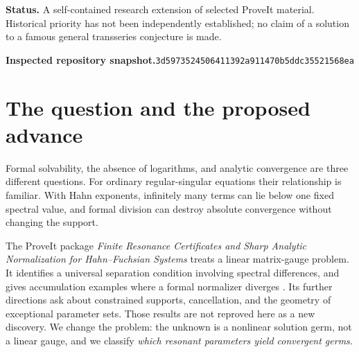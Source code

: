 \documentclass[11pt,a4paper]{article}
\numberwithin{equation}{section}
\theoremstyle{definition}
\theoremstyle{remark}
\newcommand{\snap}{\texttt{3d5973524506411392a911470b5ddc35521568ea}}
\begin{document}
\begin{titlepage}
\begin{abstract}
All theorem-level arguments are given in the article. The accompanying
program checks 670 exact scalar equalities, including 21 finite systems.
These computations are consistency checks, not a formal verification of
the infinite-support results.
\end{abstract}
\vfill
\noindent\small\textbf{Status.} A self-contained research extension of selected
ProveIt material. Historical priority has not been independently established;
no claim of a solution to a famous general transseries conjecture is made.\par
\vspace{2mm}
\noindent\small\textbf{Inspected repository snapshot.}\quad\snap
\end{titlepage}
\hypersetup{pageanchor=true}
\tableofcontents
\newpage

\section{The question and the proposed advance}
\label{sec:intro}

Formal solvability, the absence of logarithms, and analytic convergence are
three different questions. For ordinary regular-singular equations their
relationship is familiar. With Hahn exponents, infinitely many terms can
lie below one fixed spectral value, and formal division can destroy
absolute convergence without changing the support.

The ProveIt package \emph{Finite Resonance Certificates and Sharp Analytic
Normalization for Hahn--Fuchsian Systems} treats a linear matrix-gauge
problem. It identifies a universal separation condition involving spectral
differences, and gives accumulation examples where a formal normalizer
diverges \cite{repo-linear}. Its further directions ask about constrained
supports, cancellation, and the geometry of exceptional parameter sets.
Those results are not reproved here as a new discovery. We change the
problem: the unknown is a nonlinear solution germ, not a linear gauge, and
we classify \emph{which resonant parameters yield convergent germs}.
\end{document}
